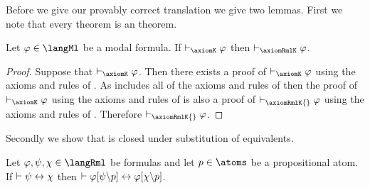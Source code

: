 Before we give our provably correct translation we give two lemmas.
First we note that every \axiomK{} theorem is an \axiomRmlK{} theorem.

\begin{lemma}\label{rml-k-ml-provability}
Let $\phi \in \langMl$ be a modal formula.
If $\proves_\axiomK \phi$ then $\proves_\axiomRmlK \phi$.
\end{lemma}

\begin{proof}
Suppose that $\proves_\axiomK \phi$.
Then there exists a proof of $\proves_\axiomK \phi$ using the axioms and rules of \axiomK{}.
As \axiomRmlK{} includes all of the axioms and rules of \axiomK{} then the proof of $\proves_\axiomK \phi$ using the axioms and rules of \axiomK{} is also a proof of $\proves_\axiomRmlK{} \phi$ using the axioms and rules of \axiomRmlK{}.
Therefore $\proves_\axiomRmlK{} \phi$.
\end{proof}

Secondly we show that \axiomRmlK{} is closed under substitution of equivalents.

\begin{lemma}\label{rml-k-substitution-equivalents}
Let $\phi, \psi, \chi \in \langRml$ be formulas and let $\atomP \in \atoms$ be a propositional atom.
If $\vdash \psi \leftrightarrow \chi$ then $\vdash \varphi[\psi\backslash p] \leftrightarrow \varphi[\chi\backslash p]$.
\end{lemma}

